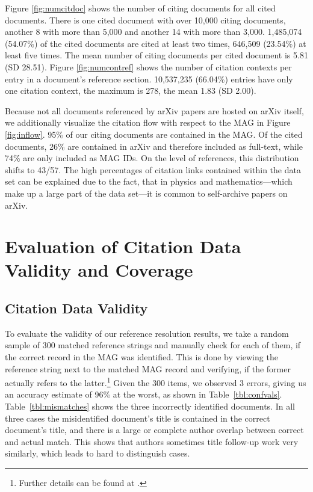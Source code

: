 Figure \ref{fig:numcitdoc} shows the number of citing documents for all cited documents. There is one cited document with over 10,000 citing documents, another 8 with more than 5,000 and another 14 with more than 3,000. 1,485,074 (54.07\%) of the cited documents are cited at least two times, 646,509 (23.54\%) at least five times. The mean number of citing documents per cited document is 5.81 (SD 28.51). Figure \ref{fig:numcontref} shows the number of citation contexts per entry in a document's reference section. 10,537,235 (66.04\%) entries have only one citation context, the maximum is 278, the mean 1.83 (SD 2.00).

Because not all documents referenced by arXiv papers are hosted on arXiv itself, we additionally visualize the citation flow with respect to the MAG in Figure \ref{fig:inflow}. 95\% of our citing documents are contained in the MAG. Of the cited documents, 26\% are contained in arXiv and therefore included as full-text, while 74\% are only included as MAG IDs. On the level of references, this distribution shifts to 43/57. The high percentages of citation links contained within the data set can be explained due to the fact, that in physics and mathematics---which make up a large part of the data set---it is common to self-archive papers on arXiv.

\section{Evaluation of Citation Data Validity and Coverage}
\label{sec:evaluation-validity-and-coverage}

\subsection{Citation Data Validity}
\label{sec:evaluation-reference-resolution}
To evaluate the validity of our reference resolution results, we take a random sample of 300 matched reference strings and manually check for each of them, if the correct record in the MAG was identified. This is done by viewing the reference string next to the matched MAG record and verifying, if the former actually refers to the latter.\footnote{Further details can be found at .} Given the 300 items, we observed 3 errors, giving us an accuracy estimate of 96\% at the worst, as shown in Table~\ref{tbl:confvals}. Table~\ref{tbl:mismatches} shows the three incorrectly identified documents. In all three cases the misidentified document's title is contained in the correct document's title, and there is a large or complete author overlap between correct and actual match. This shows that authors sometimes title follow-up work very similarly, which leads to hard to distinguish cases.

